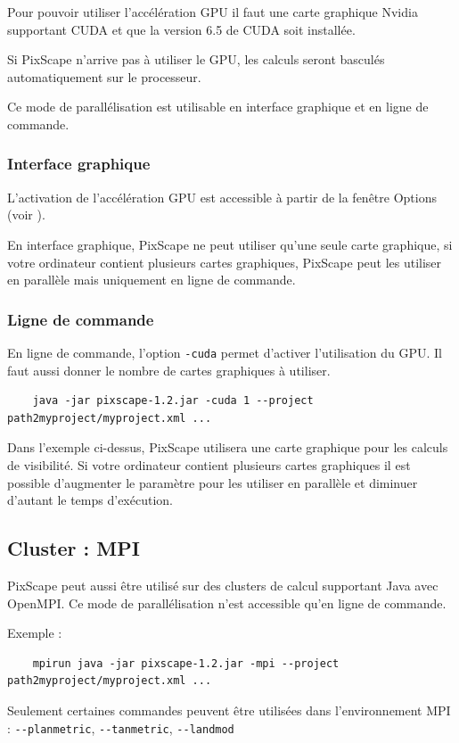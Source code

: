 \documentclass{report}
\begin{document}
Pour pouvoir utiliser l'accélération GPU il faut une carte graphique Nvidia supportant CUDA et que la version 6.5 de CUDA soit installée. 

Si PixScape n'arrive pas à utiliser le GPU, les calculs seront basculés automatiquement sur le processeur.

Ce mode de parallélisation est utilisable en interface graphique et en ligne de commande.

\subsubsection{Interface graphique}

L'activation de l'accélération GPU est accessible à partir de la fenêtre Options (voir ).

En interface graphique, PixScape ne peut utiliser qu'une seule carte graphique, si votre ordinateur contient plusieurs cartes graphiques, PixScape peut les utiliser en parallèle mais uniquement en ligne de commande.

\subsubsection{Ligne de commande}
En ligne de commande, l'option \verb|-cuda| permet d'activer l'utilisation du GPU. Il faut aussi donner le nombre de cartes graphiques à utiliser.

\begin{Verbatim}
	java -jar pixscape-1.2.jar -cuda 1 --project path2myproject/myproject.xml ...
\end{Verbatim}
Dans l'exemple ci-dessus, PixScape utilisera une carte graphique pour les calculs de visibilité. Si votre ordinateur contient plusieurs cartes graphiques il est possible d'augmenter le paramètre pour les utiliser en parallèle et diminuer d'autant le temps d'exécution.


\subsection{Cluster : MPI}
PixScape peut aussi être utilisé sur des clusters de calcul supportant Java avec OpenMPI. Ce mode de parallélisation n'est accessible qu'en ligne de commande.

Exemple :
\begin{Verbatim}
	mpirun java -jar pixscape-1.2.jar -mpi --project path2myproject/myproject.xml ...
\end{Verbatim}
Seulement certaines commandes peuvent être utilisées dans l'environnement MPI : \verb|--planmetric|, \verb|--tanmetric|, \verb|--landmod|
\end{document}

